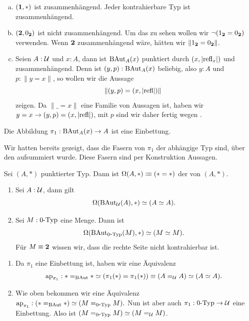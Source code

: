 \begin{beispiel}
  \begin{enumerate}[(a)]
  \item $(\mathbf{1},\ast)$ ist zusammenhängend. Jeder kontrahierbare Typ ist zusammenhängend.
  \item $(\mathbf{2},0_{\mathbf{2}})$ ist nicht zusammenhängend. Um das zu sehen wollen wir $\neg(1_{\mathbf{2}}= 0_{\mathbf{2}})$ verwenden. Wenn $\mathbf{2}$ zusammenhängend wäre, hätten wir $\|1_{\mathbf{2}}=0_{\mathbf{2}}\|$.
  \item Seien $A:\mathcal{U}$ und $x:A$, dann ist $\mathrm{BAut}_A(x)$ punktiert durch $(x,|\mathrm{refl}_x|)$
    und zusammenhängend.
    Denn ist $(y,p):\mathrm{BAut}_A(x)$ beliebig, also $y:A$ und $p:\|y=x\|$, so wollen wir die Aussage \[\|(y,p)=(x,|\mathrm{refl}|)\|\] zeigen.
    Da \(\|\_=x\|\) eine Familie von Aussagen ist, haben wir \(y=x \to (y,p) = (x,|\mathrm{refl}|)\), mit \(p\) sind wir daher fertig wegen .
  \end{enumerate}
\end{beispiel}

\begin{bemerkung}
  Die Abbildung $\pi_1:\mathrm{BAut}_A(x)\to A$ ist eine Einbettung.
\end{bemerkung}

\begin{beweis}
  Wir hatten bereits gezeigt, dass die Fasern von $\pi_1$ der abhängige Typ sind, über den aufsummiert wurde. Diese Fasern sind per Konstruktion Aussagen.
\end{beweis}

\begin{definition}
  Sei $(A,\ast)$ punktierter Typ.
  Dann ist $\Omega(A,\ast)\vcentcolon\mspace{-1.2mu}\equiv (\ast=\ast)$ der  von $(A,\ast)$.
\end{definition}

\begin{bemerkung}
  \begin{enumerate}
  \item Sei $A:\mathcal{U}$, dann gilt 
    \[\Omega(\BAut_{\mU}(A),\ast)\simeq (A\simeq A)\rlap{.}\]
  \item Sei $M:0\mbox{-}\mathrm{Typ}$ eine Menge.
  Dann ist
  \[\Omega(\BAut_{\nType{0}}(M),\ast)\simeq (M\simeq M)\rlap{.}\]
  Für $M\equiv \mathbf{2}$ wissen wir, dass die rechte Seite nicht kontrahierbar ist.
  \end{enumerate}
\end{bemerkung}

\begin{beweis}
  \begin{enumerate}
  \item Da $\pi_1$ eine Einbettung ist, haben wir eine Äquivalenz
    \[\ap_{\pi_1}:\ast=_{\BAut}\ast\simeq (\pi_1(\ast)=\pi_1(\ast))\equiv (A=_\mU A)\simeq (A\simeq A)\rlap{.} \]
  \item Wie oben bekommen wir eine Äquivalenz
    $\mathrm{ap}_{\pi_1}:(\ast=_{\mathrm{BAut}}\ast)\simeq (M=_{0\mbox{-}\mathrm{Typ}}M).$
    Nun ist aber auch $\pi_1:0\mbox{-}\mathrm{Typ}\to \mathcal{U}$ eine Einbettung.
    Also ist $(M=_{0\mbox{-}\mathrm{Typ}}M)\simeq (M=_{\mathcal{U}} M)$.
  \end{enumerate}
\end{beweis}

